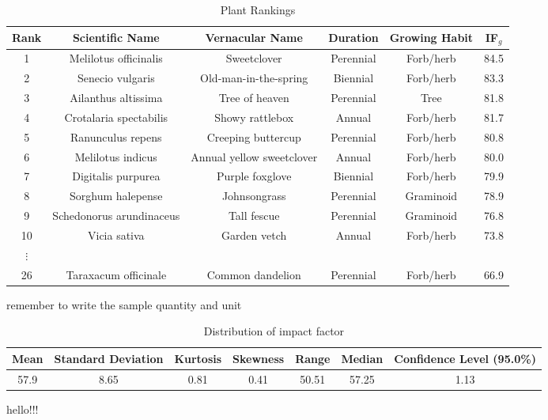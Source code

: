 \documentclass[12pt]{article}
\begin{document}
		{
			\fontsize{10}{14}\selectfont
			{
				\begin{longtable}{cccccc}
					\caption{Plant Rankings}
					\label{tb:ranks}\\
					
					\toprule
					Rank&Scientific Name&Vernacular Name&Duration&Growing Habit&IF$_g$\\
					\toprule
					1&Melilotus officinalis&Sweetclover&Perennial&Forb/herb&84.5\\
					2&Senecio vulgaris&Old-man-in-the-spring&Biennial&Forb/herb&83.3\\
					3&Ailanthus altissima&Tree of heaven&Perennial&Tree&81.8\\
					4&Crotalaria spectabilis&Showy rattlebox&Annual&Forb/herb&81.7\\
					5&Ranunculus repens&Creeping buttercup&Perennial&Forb/herb&80.8\\
					6&Melilotus indicus&Annual yellow sweetclover&Annual&Forb/herb&80.0\\
					7&Digitalis purpurea&Purple foxglove&Biennial&Forb/herb&79.9\\
					8&Sorghum halepense&Johnsongrass&Perennial&Graminoid&78.9\\
					9&Schedonorus arundinaceus&Tall fescue&Perennial&Graminoid&76.8\\
					10&Vicia sativa&Garden vetch&Annual&Forb/herb&73.8\\
					$\vdots$\\
					26&Taraxacum officinale&Common dandelion&Perennial&Forb/herb&66.9\\
					\bottomrule
				\end{longtable}
			}
		}
		
		remember to write the sample quantity and unit \\

		{
			\fontsize{10}{14}\selectfont
			{
				\begin{longtable}{ccccccc}
					\caption{Distribution of impact factor}
					\label{tb:IFDistribution}\\
					
					\toprule
					Mean&Standard Deviation&Kurtosis&Skewness&Range&Median&Confidence Level (95.0\%)\\
					\toprule
					57.9&8.65&0.81&0.41&50.51&57.25&1.13\\
					\bottomrule
				\end{longtable}
			}
		}
		
		hello!!! \\
		
\end{document}
